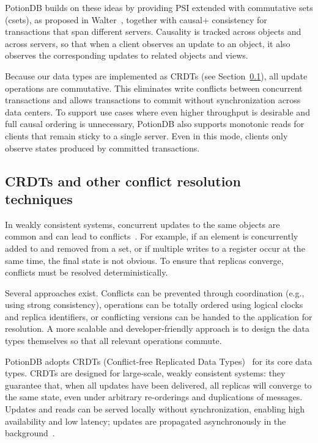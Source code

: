 PotionDB builds on these ideas by providing PSI extended with commutative sets
(csets), as proposed in Walter~\cite{walter}, together with causal+ consistency for
transactions that span different servers. Causality is tracked across objects and
across servers, so that when a client observes an update to an object, it also
observes the corresponding updates to related objects and views.

Because our data types are implemented as CRDTs (see
Section~\ref{sec:crdts}), all update operations are commutative. This eliminates
write conflicts between concurrent transactions and allows transactions to commit
without synchronization across data centers. To support use cases where even
higher throughput is desirable and full causal ordering is unnecessary, PotionDB
also supports monotonic reads for clients that remain sticky to a single server.
Even in this mode, clients only observe states produced by committed
transactions.

\subsection{CRDTs and other conflict resolution techniques}
\label{sec:crdts}

In weakly consistent systems, concurrent updates to the same objects are common
and can lead to conflicts~\cite{bailis2013eventually}. For example, if an element
is concurrently added to and removed from a set, or if multiple writes to a
register occur at the same time, the final state is not obvious. To ensure that
replicas converge, conflicts must be resolved deterministically.

Several approaches exist. Conflicts can be prevented through coordination (e.g.,
using strong consistency), operations can be totally ordered using logical clocks
and replica identifiers, or conflicting versions can be handed to the
application for resolution. A more scalable and developer-friendly approach is
to design the data types themselves so that all relevant operations commute.

PotionDB adopts CRDTs (Conflict-free Replicated Data Types)~\cite{crdt}
for its core data types. CRDTs are designed for large-scale, weakly consistent
systems: they guarantee that, when all updates have been delivered, all replicas
will converge to the same state, even under arbitrary re-orderings and
duplications of messages. Updates and reads can be served locally without
synchronization, enabling high availability and low latency; updates are
propagated asynchronously in the background~\cite{crdt,stateCRDT,crdt-caching}.

